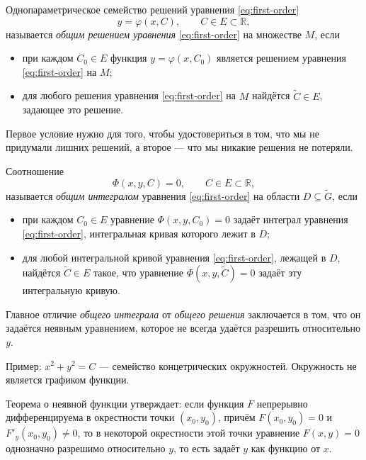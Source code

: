 \documentclass[12pt,a4paper]{article}
\numberwithin{equation}{section}
\begin{document}
\begin{definitionHSE}
Однопараметрическое семейство решений уравнения \eqref{eq:first-order}
\[
y=\varphi(x,C),\qquad C\in E\subset\mathbb{R},
\]
называется \textit{общим решением уравнения} \eqref{eq:first-order} на множестве $M$, если
\begin{itemize}
\item при каждом $C_0\in E$ функция \(y=\varphi(x,C_0)\) является решением уравнения \eqref{eq:first-order} на \(M\);
\item для любого решения уравнения \eqref{eq:first-order} на \(M\) найдётся \(\tilde{C}\in E\), задающее это решение.
\end{itemize}
\end{definitionHSE}

Первое условие нужно для того, чтобы удостовериться в том, что мы не придумали лишних решений, а второе --- что мы никакие решения не потеряли.

\begin{definitionHSE}
Соотношение
\[
\Phi(x,y,C)=0,\qquad C\in E\subset\mathbb{R},
\]
называется \textit{общим интегралом} уравнения \eqref{eq:first-order} на области \(D\subseteq\tilde{G}\), если
\begin{itemize}
\item при каждом $C_0\in E$ уравнение \(\Phi(x,y,C_0)=0\) задаёт интеграл уравнения \eqref{eq:first-order}, интегральная кривая которого лежит в \(D\);
\item для любой интегральной кривой уравнения \eqref{eq:first-order}, лежащей в \(D\), найдётся $\tilde{C}\in E$ такое, что уравнение \(\Phi(x,y,\tilde{C})=0\) задаёт эту интегральную кривую.
\end{itemize}
\end{definitionHSE}

\begin{remarkHSE}
\end{remarkHSE}

Главное отличие \textit{общего интеграла} от \textit{общего решения} заключается в том, что он задаётся неявным уравнением, которое не всегда удаётся разрешить относительно \(y\).

Пример: \(x^2+y^2=C\) --- семейство концетрических окружностей. Окружность не является графиком функции.

Теорема о неявной функции утверждает: если функция \(F\) непрерывно дифференцируема в окрестности точки \((x_0,y_0)\), причём \(F(x_0,y_0)=0\) и \(F'_y(x_0,y_0)\neq 0\), то в некоторой окрестности этой точки уравнение \(F(x,y)=0\) однозначно разрешимо относительно \(y\), то есть задаёт \(y\) как функцию от \(x\).
\end{document}
